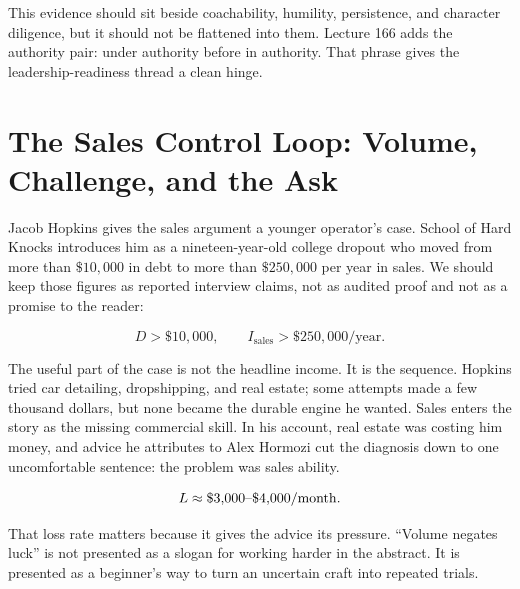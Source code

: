 \documentclass[11pt,oneside]{book}
\begin{document}
\begin{remark}
This evidence should sit beside coachability, humility, persistence, and character diligence, but it should not be flattened into them. Lecture 166 adds the authority pair: under authority before in authority. That phrase gives the leadership-readiness thread a clean hinge.
\end{remark}


\section{The Sales Control Loop: Volume, Challenge, and the Ask}

Jacob Hopkins gives the sales argument a younger operator's case. School of Hard Knocks introduces him as a nineteen-year-old college dropout who moved from more than \(\$10{,}000\) in debt to more than \(\$250{,}000\) per year in sales. We should keep those figures as reported interview claims, not as audited proof and not as a promise to the reader:

\begin{equation}
D > \$10{,}000,
\qquad
I_{\mathrm{sales}} > \$250{,}000/\mathrm{year}.
\end{equation}

The useful part of the case is not the headline income. It is the sequence. Hopkins tried car detailing, dropshipping, and real estate; some attempts made a few thousand dollars, but none became the durable engine he wanted. Sales enters the story as the missing commercial skill. In his account, real estate was costing him money, and advice he attributes to Alex Hormozi cut the diagnosis down to one uncomfortable sentence: the problem was sales ability.

\begin{equation}
L \approx \$3{,}000\hbox{--}\$4{,}000/\mathrm{month}.
\end{equation}

That loss rate matters because it gives the advice its pressure. ``Volume negates luck'' is not presented as a slogan for working harder in the abstract. It is presented as a beginner's way to turn an uncertain craft into repeated trials.
\end{document}
